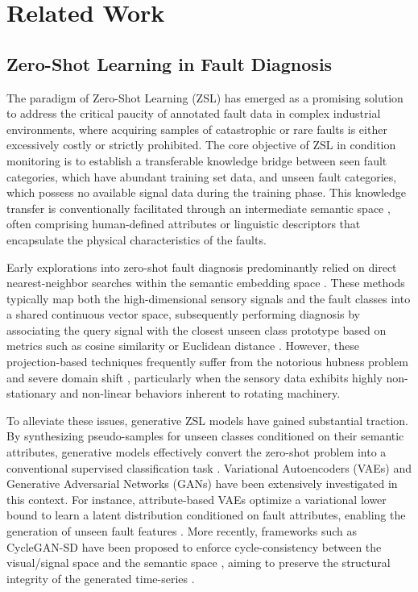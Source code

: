 \section{Related Work}

\subsection{Zero-Shot Learning in Fault Diagnosis}

The paradigm of Zero-Shot Learning (ZSL) has emerged as a promising solution to address the critical paucity of annotated fault data in complex industrial environments, where acquiring samples of catastrophic or rare faults is either excessively costly or strictly prohibited. The core objective of ZSL in condition monitoring is to establish a transferable knowledge bridge between seen fault categories, which have abundant training set data, and unseen fault categories, which possess no available signal data during the training phase. This knowledge transfer is conventionally facilitated through an intermediate semantic \cite{mikolov2013efficient} space \cite{mikolov2013efficient}, often comprising human-defined attributes or linguistic descriptors that encapsulate the physical characteristics of the faults.

Early explorations into zero-shot fault diagnosis predominantly relied on direct nearest-neighbor searches within the semantic \cite{mikolov2013efficient} embedding space \cite{mikolov2013efficient}. These methods typically map both the high-dimensional sensory signals and the fault classes into a shared continuous vector space, subsequently performing diagnosis by associating the query signal with the closest unseen class prototype based on metrics such as cosine similarity or Euclidean distance \cite{tzeng2017adversarial}. However, these projection-based techniques frequently suffer from the notorious hubness problem \cite{xian2019zero} and severe domain shift \cite{tzeng2017adversarial}, particularly when the sensory data exhibits highly non-stationary and non-linear behaviors inherent to rotating machinery.

To alleviate these issues, generative ZSL models \cite{xian2018feature} have gained substantial traction. By synthesizing pseudo-samples for unseen classes conditioned on their semantic \cite{mikolov2013efficient} attributes, generative models effectively convert the zero-shot problem into a conventional supervised classification task \cite{liao2024cyclegan}. Variational Autoencoders (VAEs) \cite{lv2020hybrid} and Generative Adversarial Networks (GANs) have been extensively investigated in this context. For instance, attribute-based VAEs optimize a variational lower bound to learn a latent distribution conditioned on fault attributes, enabling the generation of unseen fault features \cite{wang2020deep}. More recently, frameworks such as CycleGAN-SD \cite{liao2024cyclegan,zhu2017unpaired} have been proposed to enforce cycle-consistency between the visual/signal space and the semantic \cite{radford2021learning} space \cite{mikolov2013efficient}, aiming to preserve the structural integrity of the generated time-series \cite{wang2020deep}. 

